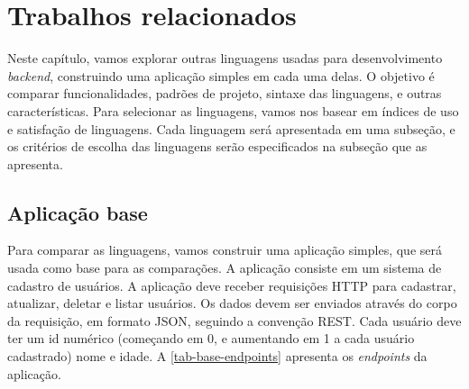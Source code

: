 
\chapter{Trabalhos relacionados}\label{chapter:trabalhos-relacionados}

Neste capítulo, vamos explorar outras linguagens usadas para desenvolvimento \textit{backend},
construindo uma aplicação simples em cada uma delas. O objetivo é comparar funcionalidades,
padrões de projeto, sintaxe das linguagens, e outras características. Para selecionar
as linguagens, vamos nos basear em índices de uso e satisfação de linguagens. Cada
linguagem será apresentada em uma subseção, e os critérios de escolha das linguagens
serão especificados na subseção que as apresenta.

\section{Aplicação base}\label{sec:aplicacao-base}

Para comparar as linguagens, vamos construir uma aplicação simples, que será usada
como base para as comparações. A aplicação consiste em um sistema de cadastro de
usuários. A aplicação deve receber requisições HTTP para cadastrar, atualizar, deletar
e listar usuários. Os dados devem ser enviados através do corpo da requisição, em
formato JSON, seguindo a convenção REST. Cada usuário deve ter um id numérico
(começando em 0, e aumentando em 1 a cada usuário cadastrado) nome e idade. A
\autoref{tab-base-endpoints} apresenta os \textit{endpoints} da aplicação.


\begin{table}[htb]
  \caption[\textit{Endpoints} da aplicação base]{\textit{Endpoints} da aplicação base}
  \label{tab-base-endpoints}
\end{table}

